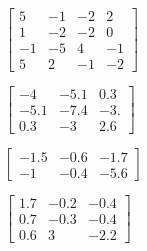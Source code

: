 \begin{exercise}
\begin{Parts}
\begin{OmitV1}
\item \(\begin{bmatrix} 5&-1&-2&2
\\1&-2&-2&0
\\-1&-5&4&-1
\\5&2&-1&-2 \end{bmatrix}\)
\end{OmitV1}

\item \(\begin{bmatrix} -4&-5.1&0.3
\\-5.1&-7.4&-3.
\\0.3&-3&2.6 \end{bmatrix}\)

\item \(\begin{bmatrix} -1.5&-0.6&-1.7
\\-1&-0.4&-5.6 \end{bmatrix}\)

\item \(\begin{bmatrix} 1.7&-0.2&-0.4
\\0.7&-0.3&-0.4
\\0.6&3&-2.2 \end{bmatrix}\)
\end{Parts}
\end{exercise}

